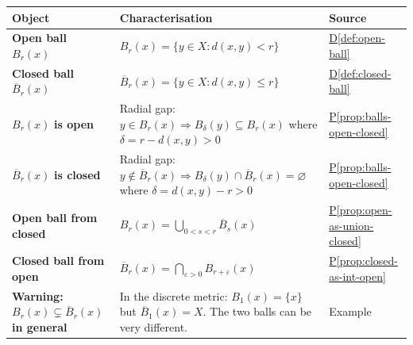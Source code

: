 
\begin{tcolorbox}[colback=gray!6, colframe=gray!40, arc=2pt,
  left=8pt, right=8pt, top=6pt, bottom=6pt,
  title={\small\textbf{Part I \enspace Balls}},
  fonttitle=\small\bfseries]
\small
\renewcommand{\arraystretch}{1.55}
\begin{tabular}{p{3.8cm} p{6.2cm} p{3.6cm}}
\toprule
\textbf{Object} & \textbf{Characterisation} & \textbf{Source} \\
\midrule

\textbf{Open ball} $B_r(x)$
  & $B_r(x) = \{y \in X : d(x,y) < r\}$
  & \hyperref[def:open-ball]{D\ref*{def:open-ball}} \\[2pt]

\textbf{Closed ball} $\overline{B}_r(x)$
  & $\overline{B}_r(x) = \{y \in X : d(x,y) \le r\}$
  & \hyperref[def:closed-ball]{D\ref*{def:closed-ball}} \\[6pt]

$B_r(x)$ \textbf{is open}
  & Radial gap: $y \in B_r(x) \Rightarrow B_\delta(y) \subseteq B_r(x)$
    where $\delta = r - d(x,y) > 0$
  & \hyperref[prop:balls-open-closed]{P\ref*{prop:balls-open-closed}} \\[2pt]

$\overline{B}_r(x)$ \textbf{is closed}
  & Radial gap: $y \notin \overline{B}_r(x) \Rightarrow B_\delta(y) \cap \overline{B}_r(x) = \varnothing$
    where $\delta = d(x,y) - r > 0$
  & \hyperref[prop:balls-open-closed]{P\ref*{prop:balls-open-closed}} \\[6pt]

\textbf{Open ball from closed}
  & $B_r(x) = \bigcup_{0 < s < r} \overline{B}_s(x)$
  & \hyperref[prop:open-as-union-closed]{P\ref*{prop:open-as-union-closed}} \\[2pt]

\textbf{Closed ball from open}
  & $\overline{B}_r(x) = \bigcap_{\varepsilon>0} B_{r+\varepsilon}(x)$
  & \hyperref[prop:closed-as-int-open]{P\ref*{prop:closed-as-int-open}} \\[6pt]

\textbf{Warning: }$B_r(x) \subsetneq \overline{B}_r(x)$ \textbf{in general}
  & In the discrete metric: $B_1(x) = \{x\}$ but
    $\overline{B}_1(x) = X$. The two balls can be very different.
  & Example \\[2pt]

\bottomrule
\end{tabular}
\end{tcolorbox}

